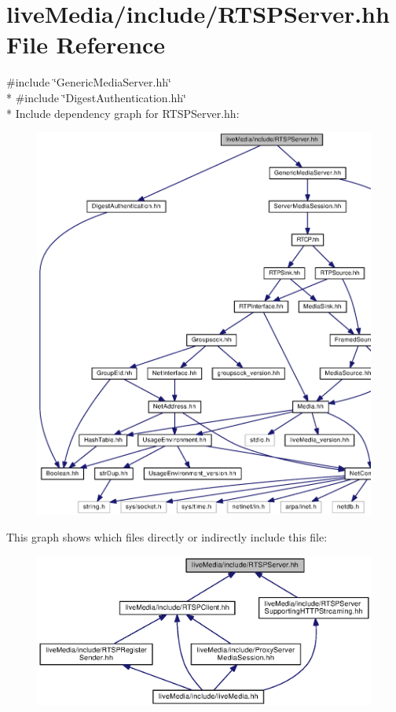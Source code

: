 \section{live\+Media/include/\+R\+T\+S\+P\+Server.hh File Reference}
\label{RTSPServer_8hh}
{\ttfamily \#include \char`\"{}Generic\+Media\+Server.\+hh\char`\"{}}\\*
{\ttfamily \#include \char`\"{}Digest\+Authentication.\+hh\char`\"{}}\\*
Include dependency graph for R\+T\+S\+P\+Server.\+hh\+:
\nopagebreak
\begin{figure}[H]
\begin{center}
\leavevmode
\includegraphics[width=350pt]{RTSPServer_8hh__incl}
\end{center}
\end{figure}
This graph shows which files directly or indirectly include this file\+:
\nopagebreak
\begin{figure}[H]
\begin{center}
\leavevmode
\includegraphics[width=350pt]{RTSPServer_8hh__dep__incl}
\end{center}
\end{figure}
